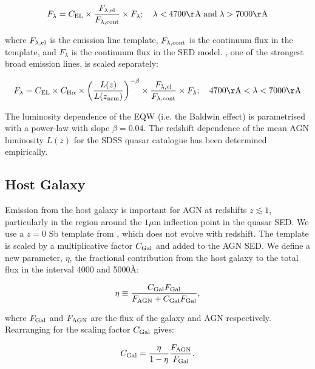 \begin{eqnarray}
  F_{\lambda} =  C_{\rm EL} \times \frac{F_{\lambda, \rm el}}{F_{\lambda, \rm cont}} \times F_{\lambda} ; \quad \lambda < 4700{\rm \AA} \;{\rm and}\; \lambda > 7000{\rm \AA} 
\end{eqnarray} 

where $F_{\lambda, \rm el}$ is the emission line template, $F_{\lambda,\rm cont}$ is the continuum flux in the template, and $F_{\lambda}$ is the continuum flux in the SED model.  
\hans, one of the strongest broad emission lines, is scaled separately: 

\begin{equation}
  F_{\lambda} =  C_{\rm EL} \times C_{{\rm H} \alpha} \times \left( \frac{L(z)} {L(z_{\rm nrm})} \right)^{-\beta} \times \frac{F_{\lambda, \rm el}}{F_{\lambda, \rm cont}} \times F_{\lambda}; \quad 4700{\rm \AA} < \lambda < 7000{\rm \AA} 
\end{equation}

The luminosity dependence of the \ha EQW (i.e. the Baldwin effect) is parametrised with a power-law with slope $\beta=0.04$.
The redshift dependence of the mean AGN luminosity $L(z)$ for the SDSS quasar catalogue has been determined empirically.

\subsection{Host Galaxy}

Emission from the host galaxy is important for AGN at redshifts $z\lesssim1$, particularly in the region around the $1\mu$m inflection point in the quasar SED. 
We use a $z=0$ Sb template from \citet{mannucci01}, which does not evolve with redshift.
The template is scaled by a multiplicative factor $C_{\rm Gal}$ and added to the AGN SED. 
We define a new parameter, $\eta$, the fractional contribution from the host galaxy to the total flux in the interval 4000 and 5000\AA:

\begin{eqnarray}
  \eta \equiv \frac{C_{\rm Gal}F_{\rm Gal}}{F_{\rm AGN} + C_{\rm Gal}F_{\rm Gal}},
\end{eqnarray}

where $F_{\rm Gal}$ and $F_{\rm AGN}$ are the flux of the galaxy and AGN respectively. 
Rearranging for the scaling factor $C_{\rm Gal}$ gives:

\begin{eqnarray}
  C_{\rm Gal} = \frac{\eta}{1 - \eta} \frac{F_{\rm AGN}}{F_{\rm Gal}}.
\end{eqnarray}

